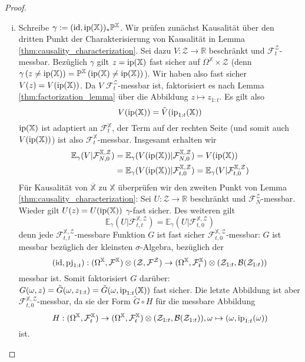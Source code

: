 \begin{proof}
\begin{enumerate}[(i)]
\item Schreibe $\gamma:=(\operatorname{id}, \operatorname{ip}(\mathbb{X}))_* \mathbb{P}^\mathbb{X}$. Wir prüfen zunächst Kausalität über den dritten Punkt der Charakterisierung von Kausalität in Lemma \ref{thm:causality_characterization}. Sei dazu $V: \mathcal{Z}\rightarrow\mathbb{R}$ beschränkt und $\mathcal{F}_t^\mathcal{Z}$-messbar. Bezüglich $\gamma$ gilt $z=\operatorname{ip}(\mathbb{X})$ fast sicher auf $\Omega^\mathbb{X} \times \mathcal{Z}$ (denn $\gamma\left(z \neq \operatorname{ip}(\mathbb{X})\right) = \mathbb{P}^\mathbb{X}\left(\operatorname{ip}(\mathbb{X}) \neq \operatorname{ip}(\mathbb{X})\right)$). Wir haben also fast sicher $V(z) = V(\operatorname{ip}(\mathbb{X}))$. Da $V$ $\mathcal{F}_t^\mathcal{Z}$-messbar ist, faktorisiert es nach Lemma \ref{thm:factorization_lemma} über die Abbildung $z \mapsto z_{1:t}$. Es gilt also
$$V(\operatorname{ip}(\mathbb{X})) = \tilde{V}(\operatorname{ip}_{1:t}(\mathbb{X}))$$
$\operatorname{ip}(\mathbb{X})$ ist adaptiert an $\mathcal{F}_t^\mathbb{X}$, der Term auf der rechten Seite (und somit auch $V(\operatorname{ip}(\mathbb{X}))$) ist also $\mathcal{F}_t^\mathbb{X}$-messbar. Insgesamt erhalten wir
\begin{align*}
    \mathbb{E}_\gamma(V \vert \mathcal{F}_{N, 0}^{\mathbb{X}, \mathcal{Z}}) &= \mathbb{E}_\gamma(V(\operatorname{ip}(\mathbb{X}))\vert \mathcal{F}_{N, 0}^{\mathbb{X}, \mathcal{Z}}) = V(\operatorname{ip}(\mathbb{X})) \\
    &= \mathbb{E}_\gamma(V(\operatorname{ip}(\mathbb{X})) \vert \mathcal{F}_{t, 0}^{\mathbb{X}, \mathcal{Z}}) = \mathbb{E}_\gamma(V \vert \mathcal{F}_{t, 0}^{\mathbb{X}, \mathcal{Z}})
\end{align*}
Für Kausalität von $\overline{\mathbb{X}}$ zu $\mathbb{X}$ überprüfen wir den zweiten Punkt von Lemma \ref{thm:causality_characterization}: Sei $U: \mathcal{Z}\rightarrow \mathbb{R}$ beschränkt und $\mathcal{F}_N^\mathcal{Z}$-messbar. Wieder gilt $U(z) = U(\operatorname{ip}(\mathbb{X}))$ $\gamma$-fast sicher. Des weiteren gilt
\begin{equation}\label{eq:39i_1}
\mathbb{E}_\gamma(U \vert \mathcal{F}_{t,t}^{\mathbb{X}, \mathcal{Z}}) = \mathbb{E}_\gamma(U \vert \mathcal{F}_{t, 0}^{\mathbb{X}, \mathcal{Z}})
\end{equation}
denn jede $\mathcal{F}_{t,t}^{\mathbb{X}, \mathcal{Z}}$-messbare Funktion $G$ ist fast sicher $\mathcal{F}_{t, 0}^{\mathbb{X}, \mathcal{Z}}$-messbar: $G$ ist messbar bezüglich der kleinsten $\sigma$-Algebra, bezüglich der 
$$(\operatorname{id}, \operatorname{pj}_{1:t}): (\Omega^\mathbb{X}, \mathcal{F}^\mathbb{X})\otimes (\mathcal{Z}, \mathcal{F}^{\mathcal{Z}}) \rightarrow (\Omega^\mathbb{X}, \mathcal{F}_t^\mathbb{X}) \otimes (\mathcal{Z}_{1:t}, \mathcal{B}(\mathcal{Z}_{1:t}))$$
messbar ist. Somit faktorisiert $G$ darüber: $G(\omega, z) = \tilde{G}(\omega, z_{1:t}) = \tilde{G}(\omega, \operatorname{ip}_{1:t}(\mathbb{X}))$ fast sicher. Die letzte Abbildung ist aber $\mathcal{F}_{t,0}^{\mathbb{X}, \mathcal{Z}}$-messbar, da sie der Form $\widetilde{G}\circ H$ für die messbare Abbildung 
$$H: (\Omega^\mathbb{X}, \mathcal{F}_t^\mathbb{X}) \rightarrow (\Omega^\mathbb{X}, \mathcal{F}_t^\mathbb{X}) \otimes (\mathcal{Z}_{1:t}, \mathcal{B}(\mathcal{Z}_{1:t})), \omega \mapsto (\omega, \operatorname{ip}_{1:t}(\omega))$$
ist. 


\end{enumerate}
\end{proof}
